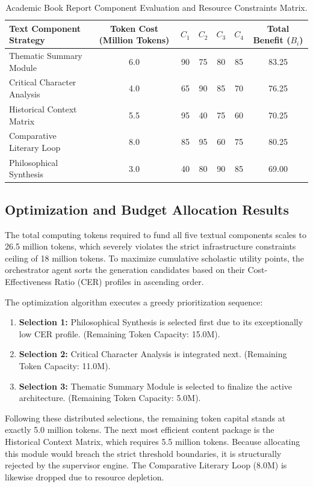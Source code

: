 \begin{table}[htbp]
\centering
\small
\begin{tabular}{lcccccc}
\toprule
\textbf{Text Component Strategy} & \textbf{Token Cost (Million Tokens)} & \textbf{$C_{1}$} & \textbf{$C_{2}$} & \textbf{$C_{3}$} & \textbf{$C_{4}$} & \textbf{Total Benefit ($B_{i}$)} \\ 
\midrule
Thematic Summary Module    & 6.0 & 90 & 75 & 80 & 85 & 83.25 \\ 
Critical Character Analysis& 4.0 & 65 & 90 & 85 & 70 & 76.25 \\ 
Historical Context Matrix & 5.5 & 95 & 40 & 75 & 60 & 70.25 \\ 
Comparative Literary Loop & 8.0 & 85 & 95 & 60 & 75 & 80.25 \\ 
Philosophical Synthesis   & 3.0 & 40 & 80 & 90 & 85 & 69.00 \\ 
\bottomrule
\end{tabular}
\caption{Academic Book Report Component Evaluation and Resource Constraints Matrix.}
\end{table}

\subsection{Optimization and Budget Allocation Results}
The total computing tokens required to fund all five textual components scales to 26.5 million tokens, which severely violates the strict infrastructure constraints ceiling of 18 million tokens. To maximize cumulative scholastic utility points, the orchestrator agent sorts the generation candidates based on their Cost-Effectiveness Ratio (CER) profiles in ascending order. 

The optimization algorithm executes a greedy prioritization sequence:
\begin{enumerate}
    \item \textbf{Selection 1:} Philosophical Synthesis is selected first due to its exceptionally low CER profile. (Remaining Token Capacity: 15.0M).
    \item \textbf{Selection 2:} Critical Character Analysis is integrated next. (Remaining Token Capacity: 11.0M).
    \item \textbf{Selection 3:} Thematic Summary Module is selected to finalize the active architecture. (Remaining Token Capacity: 5.0M).
\end{enumerate}

Following these distributed selections, the remaining token capital stands at exactly 5.0 million tokens. The next most efficient content package is the Historical Context Matrix, which requires 5.5 million tokens. Because allocating this module would breach the strict threshold boundaries, it is structurally rejected by the supervisor engine. The Comparative Literary Loop (8.0M) is likewise dropped due to resource depletion. 

